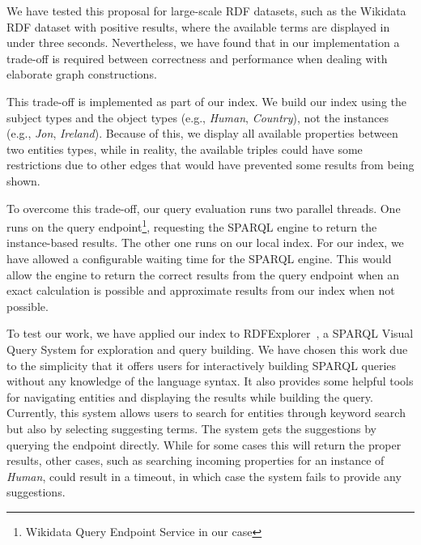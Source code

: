 We have tested this proposal for large-scale RDF datasets, such as the Wikidata RDF dataset with positive results, where the available terms are displayed in under three seconds. 
Nevertheless, we have found that in our implementation a trade-off is required between correctness and performance when dealing with elaborate graph constructions.

This trade-off is implemented as part of our index. 
We build our index using the subject types and the object types  (e.g., \textit{Human}, \textit{Country}), not the instances (e.g., \textit{Jon}, \textit{Ireland}). 
Because of this, we display all available properties between two entities types, while in reality, the available triples could have some restrictions due to other edges that would have prevented some results from being shown.

To overcome this trade-off, our query evaluation runs two parallel threads. 
One runs on the query endpoint\footnote{Wikidata Query Endpoint Service in our case}, requesting the SPARQL engine to return the instance-based results. The other one runs on our local index. 
For our index, we have allowed a configurable waiting time for the SPARQL engine. 
This would allow the engine to return the correct results from the query endpoint when an exact calculation is possible and approximate results from our index when not possible. 

To test our work, we have applied our index to RDFExplorer~\cite{Vargas2019}, a SPARQL Visual Query System for exploration and query building. 
We have chosen this work due to the simplicity that it offers users for interactively building SPARQL queries without any knowledge of the language syntax. 
It also provides some helpful tools for navigating entities and displaying the results while building the query. 
Currently, this system allows users to search for entities through keyword search but also by selecting suggesting terms. 
The system gets the suggestions by querying the endpoint directly. 
While for some cases this will return the proper results, other cases, such as searching incoming properties for an instance of \textit{Human}, could result in a timeout, in which case the system fails to provide any suggestions.

